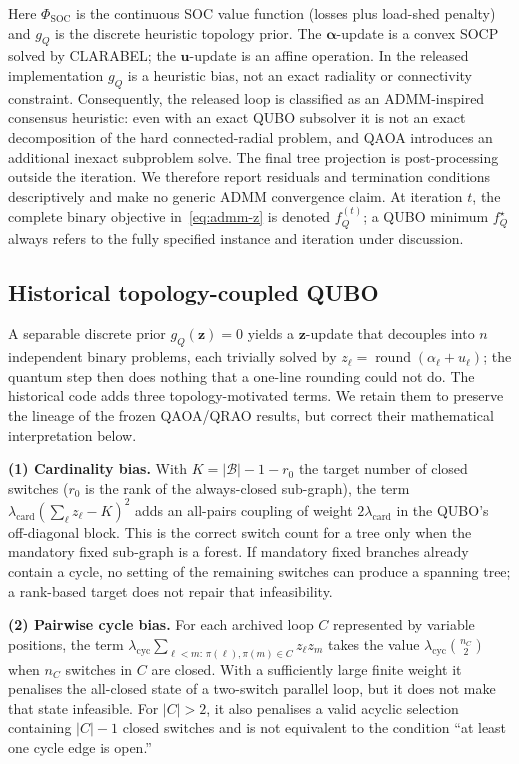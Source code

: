 \documentclass[5p,twocolumn,number,sort&compress,nopreprintline]{elsarticle}
\begin{document}
Here $\Phi_{\mathrm{SOC}}$ is the continuous SOC value function (losses plus
load-shed penalty) and $g_Q$ is the discrete heuristic topology prior. The
$\boldsymbol\alpha$-update is a convex SOCP solved by CLARABEL\@; the
$\boldsymbol u$-update is
an affine operation. In the released implementation $g_Q$ is a heuristic
bias, not an exact radiality or connectivity constraint. Consequently,
the released loop is classified as an ADMM-inspired consensus heuristic:
even with an exact QUBO subsolver it is not an exact decomposition of
the hard connected-radial problem, and QAOA introduces an additional
inexact subproblem solve. The final tree projection is post-processing
outside the iteration. We therefore report residuals and termination
conditions descriptively and make no generic ADMM convergence claim.
At iteration $t$, the complete binary objective in~\eqref{eq:admm-z}
is denoted $f_Q^{(t)}$; a QUBO minimum $f_Q^\star$ always refers to the
fully specified instance and iteration under discussion.

\subsection{Historical topology-coupled QUBO}
\label{sec:qubo}
A separable discrete prior $g_Q(\boldsymbol z)=0$ yields a
$\boldsymbol z$-update that decouples into $n$ independent binary
problems, each trivially solved by
$z_\ell=\operatorname{round}(\alpha_\ell+u_\ell)$; the quantum step then does
nothing that a one-line rounding could not do. The historical code
adds three topology-motivated terms. We retain them to preserve the
lineage of the frozen QAOA/QRAO results, but correct their mathematical
interpretation below.

\noindent\textbf{(1) Cardinality bias.}
With $K = |\mathcal{B}| - 1 - r_0$ the target number of closed
switches ($r_0$ is the rank of the always-closed sub-graph), the
term
$\lambda_{\text{card}}(\sum_\ell z_\ell-K)^2$
adds an all-pairs coupling of weight $2\lambda_{\text{card}}$ in
the QUBO's off-diagonal block. This is the correct switch count for a
tree only when the mandatory fixed sub-graph is a forest. If mandatory
fixed branches already contain a cycle, no setting of the remaining
switches can produce a spanning tree; a rank-based target does not
repair that infeasibility.

\medskip
\noindent\textbf{(2) Pairwise cycle bias.}
For each archived loop $C$ represented by variable positions, the term
$\lambda_{\text{cyc}}\sum_{\ell<m:\,\pi(\ell),\pi(m)\in C}
z_\ell z_m$ takes the value
$\lambda_{\text{cyc}}\binom{n_C}{2}$ when $n_C$ switches in $C$ are
closed. With a sufficiently large finite weight it penalises the
all-closed state of a two-switch parallel loop, but it does not make
that state infeasible. For $|C|>2$, it also penalises a valid acyclic
selection containing $|C|-1$ closed switches and is not equivalent to
the condition ``at least one cycle edge is open.''
\end{document}
